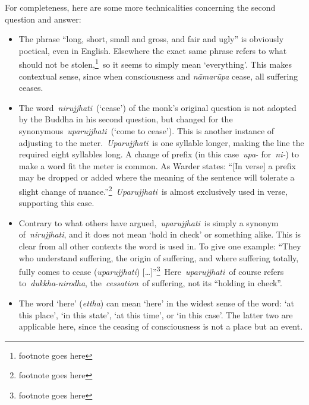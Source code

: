 \documentclass[10pt, openany]{book}
\begin{document}
For completeness, here are some more technicalities concerning the second question and answer:


\begin{itemize}

\itemsep5pt\parskip0pt


\item
The phrase “long, short, small and gross, and fair and ugly” is obviously poetical, even in English. Elsewhere the exact same phrase refers to what should not be stolen,\footnote{footnote goes here} so it seems to simply mean ‘everything’. This makes contextual sense, since when consciousness and \textit{nāmarūpa} cease, all suffering ceases.



\item
The word \textit{nirujjhati} (‘cease’) of the monk’s original question is not adopted by the Buddha in his second question, but changed for the synonymous \textit{uparujjhati} (‘come to cease’). This is another instance of adjusting to the meter. \textit{Uparujjhati} is one syllable longer, making the line the required eight syllables long. A change of prefix (in this case \textit{upa}- for \textit{ni-}) to make a word fit the meter is common. As Warder states: “[In verse] a prefix may be dropped or added where the meaning of the sentence will tolerate a slight change of nuance.”\footnote{footnote goes here} \textit{Uparujjhati} is almost exclusively used in verse, supporting this case.



\item
Contrary to what others have argued, \textit{uparujjhati} is simply a synonym of \textit{nirujjhati}, and it does not mean ‘hold in check’ or something alike. This is clear from all other contexts the word is used in. To give one example: “They who understand suffering, the origin of suffering, and where suffering totally, fully comes to cease (\textit{uparujjhati}) […]”\footnote{footnote goes here} Here \textit{uparujjhati} of course refers to \textit{dukkha}-\textit{nirodha}, the \textit{cessation} of suffering, not its “holding in check”.



\item
The word ‘here’ (\textit{ettha}) can mean ‘here’ in the widest sense of the word: ‘at this place’, ‘in this state’, ‘at this time’, or ‘in this case’. The latter two are applicable here, since the ceasing of consciousness is not a place but an event.





\end{itemize}
\end{document}
